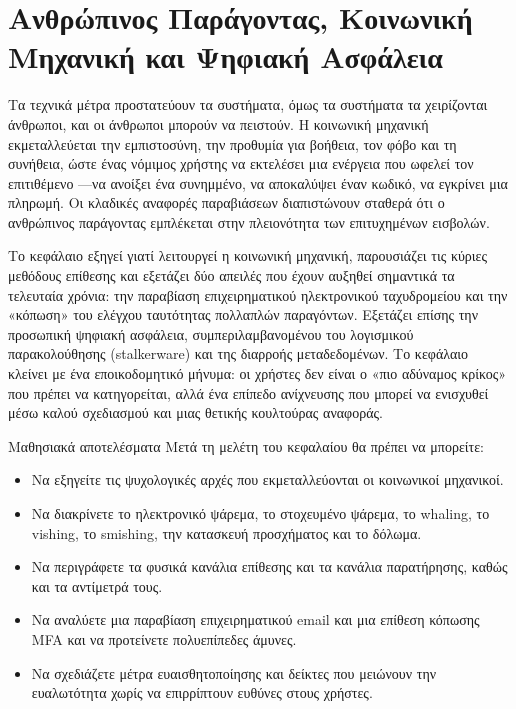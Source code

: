 \chapter{Ανθρώπινος Παράγοντας, Κοινωνική Μηχανική και Ψηφιακή Ασφάλεια}\label{ch:5}

Τα τεχνικά μέτρα προστατεύουν τα συστήματα, όμως τα συστήματα τα χειρίζονται άνθρωποι, και οι άνθρωποι μπορούν να πειστούν. Η κοινωνική μηχανική εκμεταλλεύεται την εμπιστοσύνη, την προθυμία για βοήθεια, τον φόβο και τη συνήθεια, ώστε ένας νόμιμος χρήστης να εκτελέσει μια ενέργεια που ωφελεί τον επιτιθέμενο —να ανοίξει ένα συνημμένο, να αποκαλύψει έναν κωδικό, να εγκρίνει μια πληρωμή. Οι κλαδικές αναφορές παραβιάσεων διαπιστώνουν σταθερά ότι ο ανθρώπινος παράγοντας εμπλέκεται στην πλειονότητα των επιτυχημένων εισβολών.

Το κεφάλαιο εξηγεί γιατί λειτουργεί η κοινωνική μηχανική, παρουσιάζει τις κύριες μεθόδους επίθεσης και εξετάζει δύο απειλές που έχουν αυξηθεί σημαντικά τα τελευταία χρόνια: την παραβίαση επιχειρηματικού ηλεκτρονικού ταχυδρομείου και την «κόπωση» του ελέγχου ταυτότητας πολλαπλών παραγόντων. Εξετάζει επίσης την προσωπική ψηφιακή ασφάλεια, συμπεριλαμβανομένου του λογισμικού παρακολούθησης (stalkerware) και της διαρροής μεταδεδομένων. Το κεφάλαιο κλείνει με ένα εποικοδομητικό μήνυμα: οι χρήστες δεν είναι ο «πιο αδύναμος κρίκος» που πρέπει να κατηγορείται, αλλά ένα επίπεδο ανίχνευσης που μπορεί να ενισχυθεί μέσω καλού σχεδιασμού και μιας θετικής κουλτούρας αναφοράς.

\begin{outcomesbox}{Μαθησιακά αποτελέσματα}
Μετά τη μελέτη του κεφαλαίου θα πρέπει να μπορείτε:
\begin{itemize}
  \item Να εξηγείτε τις ψυχολογικές αρχές που εκμεταλλεύονται οι κοινωνικοί μηχανικοί.
  \item Να διακρίνετε το ηλεκτρονικό ψάρεμα, το στοχευμένο ψάρεμα, το whaling, το vishing, το smishing, την κατασκευή προσχήματος και το δόλωμα.
  \item Να περιγράφετε τα φυσικά κανάλια επίθεσης και τα κανάλια παρατήρησης, καθώς και τα αντίμετρά τους.
  \item Να αναλύετε μια παραβίαση επιχειρηματικού email και μια επίθεση κόπωσης MFA και να προτείνετε πολυεπίπεδες άμυνες.
  \item Να σχεδιάζετε μέτρα ευαισθητοποίησης και δείκτες που μειώνουν την ευαλωτότητα χωρίς να επιρρίπτουν ευθύνες στους χρήστες.
\end{itemize}
\end{outcomesbox}

